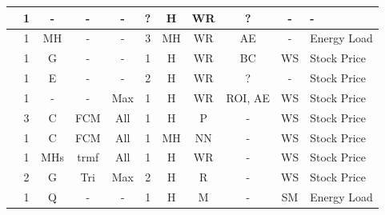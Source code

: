 \begin{center}
\begin{landscape}
\begin{longtable}[c]{|m{4cm}|c|c|c|c|c|c|c|c|c|m{5cm}|}
\cite{Cheng2012}           & 1                  & -                     & -           & -                      & ?              & H                       & WR      & ?                        & -                        & -                     \\ \hline
\cite{Enayatifar2013}      & 1                  & MH         & -           & -                      & 3              & MH                   & WR      & AE                 & -                        & Energy Load           \\ \hline
\cite{Lee2013}             & 1                  & G                  & -           & -                      & 1              & H                       & WR      & BC                  & WS            & Stock Price           \\ \hline
\cite{Chen2014}            & 1                  & E               & -           & -                      & 2              & H                       & WR      & ?                        & -                        & Stock Price           \\ \hline
\cite{Sadaei2014a}          & 1                  & -                     & -           & Max                & 1              & H                       & WR      & ROI, AE            & WS            & Stock Price           \\ \hline
\cite{Askari2015}          & 3                  & C            & FCM         & All                    & 1              & H                       & P & -                        & WS            & Stock Price           \\ \hline
\cite{Bas2015}             & 1                  & C            & FCM         & All                    & 1              & MH                             & NN                 & -                        & WS            & Stock Price           \\ \hline
\cite{Cai2015}             & 1                  & MHs        & trmf        & All                    & 1              & H                       & WR      & -                        & WS            & Stock Price           \\ \hline
\cite{Chen2015a}           & 2                  & G                  & Tri  & Max                & 2              & H                       & R               & -                        & WS            & Stock Price           \\ \hline
\cite{Ismail2015}          & 1                  & Q              & -           & -                      & 1              & H                       & M              & -                        & SM              & Energy Load           \\ \hline

\end{longtable}
\end{landscape}
\end{center}
